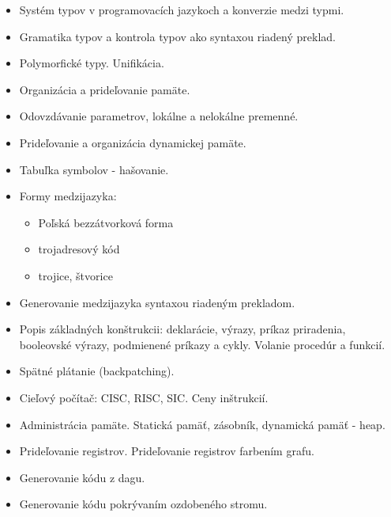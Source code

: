 \documentclass[a4paper]{report}
\begin{document}
\begin{zadanie}
\begin{itemize}
 \item Systém typov v programovacích jazykoch a konverzie medzi typmi.
 \item Gramatika typov a kontrola typov ako syntaxou riadený preklad.
 \item Polymorfické typy. Unifikácia.
\end{itemize}
\end{zadanie}

\begin{zadanie}
\begin{itemize}
 \item Organizácia a prideľovanie pamäte.
 \item Odovzdávanie parametrov, lokálne a nelokálne premenné.
 \item Prideľovanie a organizácia dynamickej pamäte.
 \item Tabuľka symbolov - hašovanie.
\end{itemize}
\end{zadanie}

\begin{zadanie}
\begin{itemize}
 \item Formy medzijazyka:
 \begin{itemize}
  \item Poľská bezzátvorková forma
  \item trojadresový kód
  \item trojice, štvorice
 \end{itemize}
 \item Generovanie medzijazyka syntaxou riadeným prekladom.
 \item Popis základných konštrukcii: deklarácie, výrazy, príkaz priradenia, booleovské výrazy, podmienené príkazy a cykly. Volanie procedúr a funkcií.
 \item Spätné plátanie (backpatching).
\end{itemize}
\end{zadanie}

\begin{zadanie}
\begin{itemize}
 \item Cieľový počítač: CISC, RISC, SIC. Ceny inštrukcií.
 \item Administrácia pamäte. Statická pamäť, zásobník, dynamická pamäť - heap.
 \item Prideľovanie registrov. Prideľovanie registrov farbením grafu.
 \item Generovanie kódu z dagu.
 \item Generovanie kódu pokrývaním ozdobeného stromu.
\end{itemize}
\end{zadanie}
\end{document}
